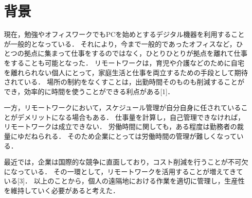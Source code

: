 \section{背景}
現在，勉強やオフィスワークでもPCを始めとするデジタル機器を利用することが一般的となっている．
それにより，今まで一般的であったオフィスなど，ひとつの拠点に集まって仕事をするのではなく，ひとりひとりが拠点を離れて仕事をすることも可能となった．
リモートワークは，育児や介護などのために自宅を離れられない個人にとって，家庭生活と仕事を両立するための手段として期待されている．
場所の制約をなくすことは，出勤時間そのものも削減することができ，効率的に時間を使うことができる利点がある[1]．

一方，リモートワークにおいて，スケジュール管理が自分自身に任されていることがデメリットになる場合もある．
仕事量を計算し，自己管理できなければ，リモートワークは成立できない．
労働時間に関しても，ある程度は勤務者の裁量にゆだねられる．
そのため企業にとっては労働時間の管理が難しくなっている．

最近では，企業は国際的な競争に直面しており，コスト削減を行うことが不可欠になっている．
その一環として，リモートワークを活用することが増えてきている[3]．
以上のことから，個人の遠隔地における作業を適切に管理し，生産性を維持していく必要があると考えた．
